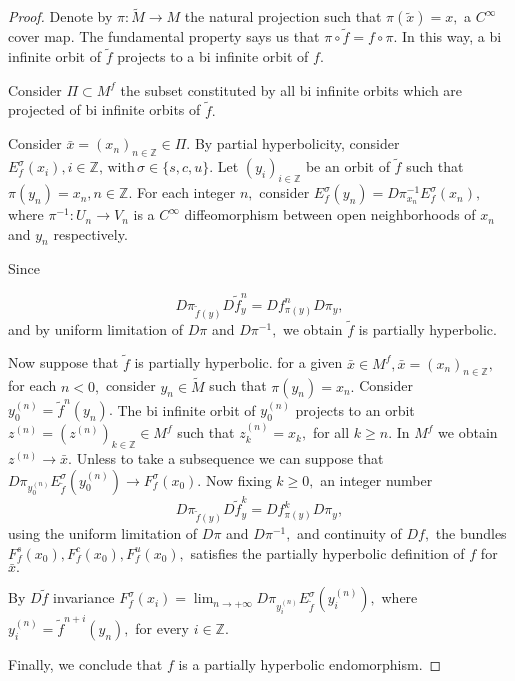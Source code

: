 \documentclass[12pt,reqno]{amsart}
\numberwithin{equation}{section}
\theoremstyle{plain}
\theoremstyle{remark}
\begin{document}
\begin{proof}

Denote by $\pi: \widetilde{M} \rightarrow M$ the natural projection such that $\pi(\tilde{x}) = x,$ a $C^{\infty}$ cover map. The fundamental property says us that $\pi \circ \widetilde{f} = f \circ \pi.$ In this way, a bi infinite orbit of $\widetilde{f}$ projects to a bi infinite orbit of $f.$

Consider $\Pi \subset M^f$ the subset constituted by all bi infinite orbits which are projected of bi infinite orbits of $\widetilde{f}.$

Consider $\bar{x} = (x_n)_{n \in \mathbb{Z}} \in \Pi.$ By partial hyperbolicity, consider $E^{\sigma}_{f}(x_i), i \in \mathbb{Z}, \,\mbox{with}\, \sigma \in\{s,c,u\}.$ Let $(y_i)_{i \in \mathbb{Z}}$ be an orbit of $\widetilde{f}$ such that $\pi(y_n) = x_n, n \in \mathbb{Z}.$ For each integer $n,$ consider $E^{\sigma}_f(y_n) = D\pi^{-1}_{x_n} E^{\sigma}_f(x_n),$ where $\pi^{-1}: U_n \rightarrow V_n$ is a $C^{\infty}$ diffeomorphism between open neighborhoods of $x_n$ and $y_n$ respectively.

Since

$$D\pi_{\widetilde{f}(y)} D\widetilde{f}^n_{y} = Df^n_{\pi(y)}D\pi_{y}, $$
and by uniform limitation of $D\pi$ and $D\pi^{-1},$ we obtain $\widetilde{f}$ is partially hyperbolic.


Now suppose that $\widetilde{f}$ is partially hyperbolic. for a given $\bar{x} \in M^f, \bar{x} =  (x_n)_{n \in \mathbb{Z}},$ for each $n < 0,$ consider $y_n \in \widetilde{M}$ such that $\pi (y_n) = x_n.$ Consider $y_0^{(n)}= \widetilde{f}^n(y_n).$ The bi infinite orbit of $y_0^{(n)}$ projects to an orbit $z^{(n)} =  (z^{(n)})_{k \in \mathbb{Z}} \in M^f$ such that $z^{(n)}_k = x_k,$ for all $k \geq n.$ In $M^f $ we obtain $z^{(n)} \rightarrow \bar{x}.$ Unless to take a subsequence we can suppose that $D\pi_{y_0^{(n)}} E^{\sigma}_{\widetilde{f}}(y_0^{(n)}) \rightarrow F^{\sigma}_f(x_0).$ Now fixing $k \geq 0,$ an integer number
$$D\pi_{\widetilde{f}(y)} D\widetilde{f}^k_{y} = Df^k_{\pi(y)}D\pi_{y}, $$
using the uniform limitation of $D\pi$ and $D\pi^{-1},$ and continuity of $Df,$ the bundles $F^s_f(x_0), F^c_f(x_0), F^u_f(x_0),$ satisfies the partially hyperbolic definition of $f$ for $\bar{x}.$


By $D\widetilde{f}$ invariance $F^{\sigma}_f(x_{i}) = \displaystyle\lim_{n  \rightarrow +\infty} D\pi_{y_i^{(n)}} E^{\sigma}_{\widetilde{f}}(y_i^{(n)}),$ where $y_i^{(n)} = \widetilde{f}^{n+i}(y_n),$ for every $i \in \mathbb{Z}.$

Finally, we conclude that $f$ is a partially hyperbolic endomorphism.







\end{proof}
\end{document}
